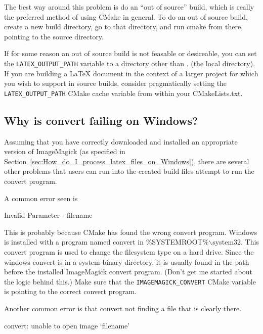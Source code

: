 \documentclass{article}
\newcommand*{\textfile}[1]{\textsf{#1}}
\newcommand*{\textprog}[1]{\textfile{#1}}
\newcommand*{\textcmake}[1]{\texttt{#1}}
\newcommand*{\textcmakevar}[1]{\textcmake{#1}}
\newcommand*{\latex}{\LaTeX\xspace}
\begin{document}
  The best way around this problem is do an ``out of source'' build, which
  is really the preferred method of using CMake in general.  To do an out
  of source build, create a new build directory, go to that directory, and
  run cmake from there, pointing to the source directory.

  If for some reason an out of source build is not feasable or desireable,
  you can set the \textcmakevar{LATEX\_OUTPUT\_PATH} variable to a
  directory other than \textfile{.} (the local directory).  If you are
  building a \latex document in the context of a larger project for which
  you wish to support in source builds, consider pragmatically setting the
  \textcmakevar{LATEX\_OUTPUT\_PATH} CMake cache variable from within your
  \textfile{CMakeLists.txt}.

  \subsection{Why is convert failing on Windows?}
  \label{sec:Why_is_convert_failing_on_Windows}

  Assuming that you have correctly downloaded and installed an appropriate
  version of ImageMagick (as specified in
  Section~\ref{sec:How_do_I_process_latex_files_on_Windows}), there are several
  other problems that users can run into the created build files attempt to
  run the convert program.

  A common error seen is 

  \begin{CodeListing}
Invalid Parameter - filename
  \end{CodeListing}

  This is probably because CMake has found the wrong \textprog{convert}
  program. Windows is installed with a program named \textprog{convert} in
  \textfile{\%SYSTEMROOT\%$\backslash$system32}. This \textprog{convert}
  program is used to change the filesystem type on a hard drive. Since the
  windows \textfile{convert} is in a system binary directory, it is usually
  found in the path before the installed ImageMagick \textfile{convert}
  program. (Don't get me started about the logic behind this.) Make sure
  that the \textcmakevar{IMAGEMAGICK\_CONVERT} CMake variable is pointing
  to the correct \textprog{convert} program.

  Another common error is that \textprog{convert} not finding a file that
  is clearly there.

  \begin{CodeListing}
convert: unable to open image `filename'
  \end{CodeListing}
\end{document}

